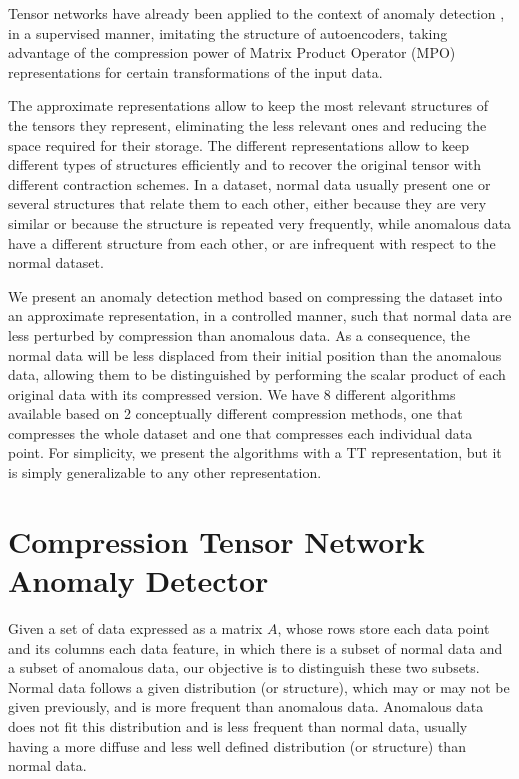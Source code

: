 \documentclass{article}
\begin{document}
Tensor networks have already been applied to the context of anomaly detection \cite{TN_Anomaly}, in a supervised manner, imitating the structure of autoencoders, taking advantage of the compression power of Matrix Product Operator (MPO) representations for certain transformations of the input data.

The approximate representations allow to keep the most relevant structures of the tensors they represent, eliminating the less relevant ones and reducing the space required for their storage. The different representations allow to keep different types of structures efficiently and to recover the original tensor with different contraction schemes. In a dataset, normal data usually present one or several structures that relate them to each other, either because they are very similar or because the structure is repeated very frequently, while anomalous data have a different structure from each other, or are infrequent with respect to the normal dataset.

We present an anomaly detection method based on compressing the dataset into an approximate representation, in a controlled manner, such that normal data are less perturbed by compression than anomalous data. As a consequence, the normal data will be less displaced from their initial position than the anomalous data, allowing them to be distinguished by performing the scalar product of each original data with its compressed version. We have 8 different algorithms available based on 2 conceptually different compression methods, one that compresses the whole dataset and one that compresses each individual data point. For simplicity, we present the algorithms with a TT representation, but it is simply generalizable to any other representation.

\section{Compression Tensor Network Anomaly Detector}
Given a set of data expressed as a matrix $A$, whose rows store each data point and its columns each data feature, in which there is a subset of normal data and a subset of anomalous data, our objective is to distinguish these two subsets. Normal data follows a given distribution (or structure), which may or may not be given previously, and is more frequent than anomalous data. Anomalous data does not fit this distribution and is less frequent than normal data, usually having a more diffuse and less well defined distribution (or structure) than normal data.
\end{document}
